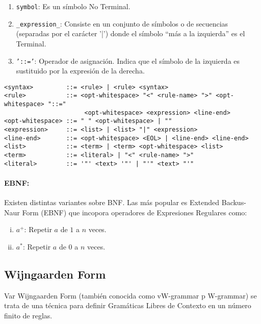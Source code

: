{\begin{enumerate}
\item \texttt{symbol}: Es un símbolo No Terminal. 

\item \texttt{\_expression\_}: Consiste en un conjunto de símbolos o de secuencias (separadas por el carácter '|') donde el símbolo ``más a la izquierda'' es el Terminal.

\item \texttt{'::='}: Operador de asignación. Indica que el símbolo de la izquierda es sustituido por la expresión de la derecha.

\end{enumerate}


\begin{verbatim}
<syntax>         ::= <rule> | <rule> <syntax>
<rule>           ::= <opt-whitespace> "<" <rule-name> ">" <opt-whitespace> "::=" 
					  <opt-whitespace> <expression> <line-end>
<opt-whitespace> ::= " " <opt-whitespace> | ""
<expression>     ::= <list> | <list> "|" <expression>
<line-end>       ::= <opt-whitespace> <EOL> | <line-end> <line-end>
<list>           ::= <term> | <term> <opt-whitespace> <list>
<term>           ::= <literal> | "<" <rule-name> ">"
<literal>        ::= '"' <text> '"' | "'" <text> "'" 
\end{verbatim}

\paragraph*{EBNF:} Existen distintas variantes sobre BNF. Las más popular es Extended Backus-Naur Form (EBNF) que incopora operadores de Expresiones Regulares como:

\begin{enumerate}[i.]

\item $a^+$: Repetir $a$ de $1$ a $n$ veces. 

\item $a^*$: Repetir $a$ de $0$ a $n$ veces.

\end{enumerate}


\subsection{Wijngaarden Form}

Var Wijngaarden Form (también conocida como vW-grammar p W-grammar) se trata de una técnica para definir Gramáticas Libres de Contexto en un número finito de reglas.

}
